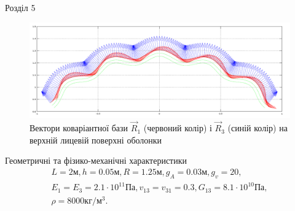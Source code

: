 \documentclass[handout, 8pt]{beamer}
\numberwithin{figure}{section}
\numberwithin{equation}{section}
\numberwithin{table}{section}
\begin{document}
\begin{frame}{Розділ 5}
\begin{figure}
	\includegraphics[scale=0.2]{pic/cor_R1R32.png}
		\caption{Вектори коваріантної бази $\vec{R}_1$ (червоний колір) і $\vec{R}_3$ (синій колір) на верхній лицевій поверхні оболонки}
\end{figure}
Геометричні та фізико-механічні  характеристики
\begin{equation}
\begin{gathered}
L=2\text{м}, h=0.05\text{м},R=1.25\text{м},g_A=0.03\text{м}, g_v=20,\\
E_1=E_3=2.1\cdot 10^{11} Па, v_{13}=v_{31}=0.3, G_{13}=8.1\cdot 10^{10} Па,\\ \rho=8000 кг/м^3.
\end{gathered}
\end{equation}
\end{frame}
\end{document}
